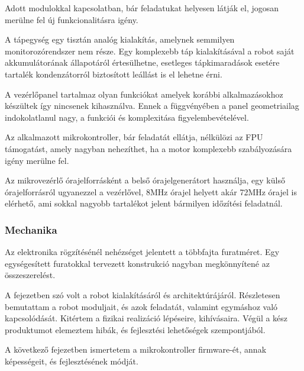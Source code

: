 Adott modulokkal kapcsolatban, bár feladatukat helyesen látják el, jogosan
merülne fel új funkcionalitásra igény.

\medskip

A tápegység egy tisztán analóg kialakítás, amelynek semmilyen monitorozórendszer
nem része. Egy komplexebb táp kialakításával a robot saját akkumulátorának
állapotáról értesülhetne, esetleges tápkimaradások esetére tartalék
kondenzátorról biztosított leállást is el lehetne érni. 

\medskip

A vezérlőpanel tartalmaz olyan funkciókat amelyek korábbi alkalmazásokhoz
készültek így nincsenek kihasználva. Ennek a függvényében a panel geometriailag
indokolatlanul nagy, a funkciói és komplexitása figyelembevételével.

Az alkalmazott mikrokontroller, bár feladatát ellátja, nélkülözi az FPU
támogatást, amely nagyban nehezíthet, ha a motor komplexebb szabályozására igény
merülne fel.

Az mikrovezérlő órajelforrásként a belső órajelgenerátort használja, egy külső
órajelforrásról ugyanezzel a vezérlővel, 8MHz órajel helyett akár 72MHz órajel is
elérhető, ami sokkal nagyobb tartalékot jelent bármilyen időzítési feladatnál.

\subsubsection{Mechanika}

Az elektronika rögzítésénél nehézséget jelentett a többfajta furatméret. Egy
egységesített furatokkal tervezett konstrukció nagyban megkönnyítené az
összeszerelést.

\bigskip

A fejezetben szó volt a robot kialakításáról és architektúrájáról. Részletesen
bemutattam a robot moduljait, és azok feladatát, valamint egymáshoz való
kapcsolódását. Kitértem a fizikai realizáció lépéseire, kihívásaira. Végül a kész
produktumot elemeztem hibák, és fejlesztési lehetőségek szempontjából.

A következő fejezetben ismertetem a mikrokontroller firmware-ét, annak
képességeit, és fejlesztésének módját. 

